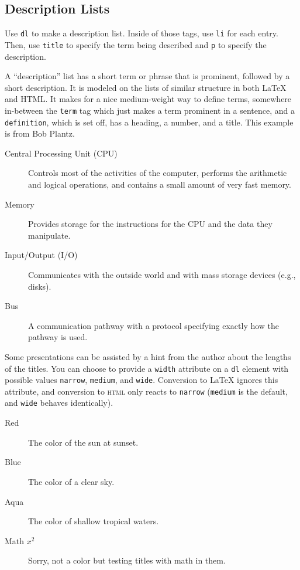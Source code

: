 \documentclass[10pt,]{article}
\newcommand{\initialism}[1]{\textsc{\MakeLowercase{#1}}}
\theoremstyle{plain}
\theoremstyle{definition}
\theoremstyle{definition}
\theoremstyle{definition}
\theoremstyle{definition}
\theoremstyle{definition}
\theoremstyle{definition}
\numberwithin{equation}{section}
\begin{document}
\subsection[{Description Lists}]{Description Lists}\label{subsection-31}
\hypertarget{p-406}{}%
Use \lstinline?dl? to make a description list. Inside of those tags, use \lstinline?li? for each entry. Then, use \lstinline?title? to specify the term being described and \lstinline?p? to specify the description.%
\par
\hypertarget{p-407}{}%
A ``description'' list has a short term or phrase that is prominent, followed by a short description.  It is modeled on the lists of similar structure in both \LaTeX{} and HTML.  It makes for a nice medium-weight way to define terms, somewhere in-between the \lstinline?term? tag which just makes a term prominent in a sentence, and a \lstinline?definition?, which is set off, has a heading, a number, and a title.  This example is from Bob Plantz.\leavevmode%
\begin{description}
\item[{Central Processing Unit (CPU)}]\hypertarget{li-134}{}\hypertarget{p-408}{}%
Controls most of the activities of the computer, performs the arithmetic and logical operations, and contains a small amount of very fast memory.%
\item[{Memory}]\hypertarget{li-135}{}\hypertarget{p-409}{}%
Provides storage for the instructions for the CPU and the data they manipulate.%
\item[{Input/Output (I/O)}]\hypertarget{li-136}{}\hypertarget{p-410}{}%
Communicates with the outside world and with mass storage devices (e.g.\@, disks).%
\item[{Bus}]\hypertarget{li-137}{}\hypertarget{p-411}{}%
A communication pathway with a protocol specifying exactly how the pathway is used.%
\end{description}
%
\par
\hypertarget{p-412}{}%
Some presentations can be assisted by a hint from the author about the lengths of the titles.  You can choose to provide a \lstinline?width? attribute on a \lstinline?dl? element with possible values \lstinline?narrow?, \lstinline?medium?, and \lstinline?wide?.  Conversion to \LaTeX{} ignores this attribute, and conversion to \initialism{HTML} only reacts to \lstinline?narrow? (\lstinline?medium? is the default, and \lstinline?wide? behaves identically).\leavevmode%
\begin{description}
\item[{Red}]\hypertarget{li-138}{}\hypertarget{p-413}{}%
The color of the sun at sunset.%
\item[{Blue}]\hypertarget{li-139}{}\hypertarget{p-414}{}%
The color of a clear sky.%
\item[{Aqua}]\hypertarget{li-140}{}\hypertarget{p-415}{}%
The color of shallow tropical waters.%
\item[{Math \(x^2\)}]\hypertarget{description-list-math-title}{}\hypertarget{p-416}{}%
Sorry, not a color but testing titles with math in them.%
\end{description}
\end{document}
